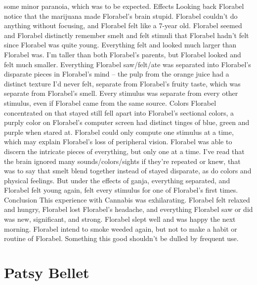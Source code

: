 \documentclass[12pt]{book}
\begin{document}
some minor paranoia, which was to be expected. Effects Looking back Florabel notice that the marijuana made Florabel's brain stupid. Florabel couldn't do anything without focusing, and Florabel felt like a 7-year old. Florabel seemed  and Florabel distinctly remember smelt and felt stimuli that Florabel hadn't felt since Florabel was quite young. Everything felt and looked much larger than Florabel was. I'm taller than both Florabel's parents, but Florabel looked and felt much smaller. Everything Florabel saw/felt/ate was separated into Florabel's disparate pieces in Florabel's mind -- the pulp from the orange juice had a distinct texture I'd never felt, separate from Florabel's fruity taste, which was separate from Florabel's smell. Every stimulus was separate from every other stimulus, even if Florabel came from the same source. Colors Florabel concentrated on that stayed still fell apart into Florabel's sectional colors, a purply color on Florabel's computer screen had distinct tinges of blue, green and purple when stared at. Florabel could only compute one stimulus at a time, which may explain Florabel's loss of peripheral vision. Florabel was able to discern the intricate pieces of everything, but only one at a time. I've read that the brain ignored many sounds/colors/sights if they're repeated or knew, that was to say that smelt blend together instead of stayed disparate, as do colors and physical feelings. But under the effects of ganja, everything separated, and Florabel felt young again, felt every stimulus for one of Florabel's first times. Conclusion This experience with Cannabis was exhilarating. Florabel felt relaxed and hungry, Florabel lost Florabel's headache, and everything Florabel saw or did was new, significant, and strong. Florabel slept well and was happy the next morning. Florabel intend to smoke weeded again, but not to make a habit or routine of Florabel. Something this good shouldn't be dulled by frequent use.



\chapter{Patsy Bellet}
\end{document}

